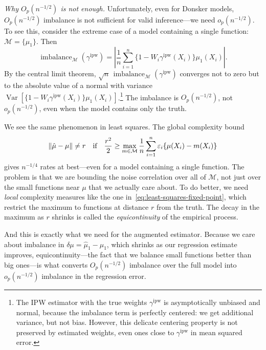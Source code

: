 \documentclass{article}
\newcommand{\paragraph}[1]{\par\noindent\textit{#1}\enspace}
\DeclarePairedDelimiter\norm{\lVert}{\rVert}
\theoremstyle{definition}
\newcommand{\ipw}{\text{ipw}}
\newcommand{\dm}{\delta \mu}
\DeclareMathOperator{\imbalance}{imbalance}
\DeclareMathOperator{\var}{Var}
\newcommand{\gammaipw}{\ensuremath{\gamma^{\ipw}}}
\newcommand{\model}{\mathcal{M}}
\newcommand{\<}{\langle}
\renewcommand{\>}{\rangle}
\begin{document}
\paragraph{Why $O_p(n^{-1/2})$ is not enough.}
Unfortunately, even for Donsker models, $O_p(n^{-1/2})$ imbalance is not sufficient for valid inference---we need $o_p(n^{-1/2})$. To see this, consider the extreme case of a model containing a single function: $\model = \{\mu_1\}$. Then
\begin{equation}
  \label{eq:single_function_imbalance}
  \imbalance_\model(\gammaipw) = \left|\frac{1}{n}\sum_{i=1}^n \{1 - W_i \gammaipw(X_i)\} \mu_1(X_i)\right|.
\end{equation}
By the central limit theorem, $\sqrt{n}\, \imbalance_\model(\gammaipw)$ converges not to zero but to the absolute value of a normal with variance $\var[\{1 - W_i \gammaipw(X_i)\} \mu_1(X_i)]$.\footnote{The IPW estimator with the true weights $\gammaipw$ is asymptotically unbiased and normal, because the imbalance term is perfectly centered: we get additional variance, but not bias. However, this delicate centering property is not preserved by estimated weights, even ones close to $\gammaipw$ in mean squared error.} The imbalance is $O_p(n^{-1/2})$, not $o_p(n^{-1/2})$, even when the model contains only the truth.

We see the same phenomenon in least squares. The global complexity bound
\begin{equation}
\label{eq:least-squares-fixed-point-naive}
\norm{\hat \mu - \mu} \neq r \quad \text{if} \quad
\frac{r^2}{2} \ge  \max_{m \in \model} \frac1n\sum_{i=1}^n \varepsilon_i \{ \mu(X_i) - m(X_i) \}
\end{equation}
gives $n^{-1/4}$ rates at best---even for a model containing a single function. The problem is that we are bounding the noise correlation over all of $\model$, not just over the small functions near $\mu$ that we actually care about. To do better, we need \emph{local} complexity measures like the one in~\eqref{eq:least-squares-fixed-point}, which restrict the maximum to functions at distance $r$ from the truth. The decay in the maximum as $r$ shrinks is called the \emph{equicontinuity} of the empirical process.

And this is exactly what we need for the augmented estimator. Because we care about imbalance in $\dm = \hat \mu_1 - \mu_1$, which shrinks as our regression estimate improves, equicontinuity---the fact that we balance small functions better than big ones---is what converts $O_p(n^{-1/2})$ imbalance over the full model into $o_p(n^{-1/2})$ imbalance in the regression error.
\end{document}

